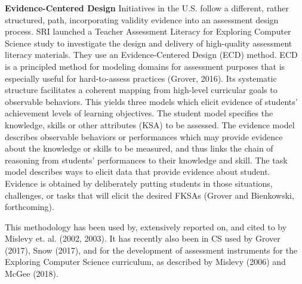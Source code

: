 \textbf{Evidence-Centered Design}\newline
Initiatives in the U.S. follow a different, rather structured, path, incorporating validity evidence into an assessment design process. SRI launched a Teacher Assessment Literacy for Exploring Computer Science study to investigate the design and delivery of high-quality assessment literacy materials. They use an Evidence-Centered Design (ECD) method. ECD is a principled method for modeling domains for assessment purposes that is especially useful for hard-to-assess practices (Grover, 2016). Its systematic structure facilitates a coherent mapping from high-level curricular goals to observable behaviors. This yields three models which elicit evidence of students' achievement levels of learning objectives. The student model specifies the knowledge, skills or other attributes (KSA) to be assessed. The evidence model describes observable behaviors or performances which may provide evidence about the knowledge or skills to be measured, and thus links the chain of reasoning from
students’ performances to their knowledge and skill. The task model describes ways to elicit data that provide evidence about student. Evidence is obtained by deliberately putting students in those situations, challenges, or tasks that will elicit the desired FKSAs (Grover and Bienkowski, forthcoming).







This methodology has been used by, extensively reported on, and cited to by Mislevy et. al. (2002, 2003). It has recently also been in CS used by Grover (2017), Snow (2017), and for the development of assessment instruments for the Exploring Computer Science curriculum, as described by Mislevy (2006) and McGee (2018).



